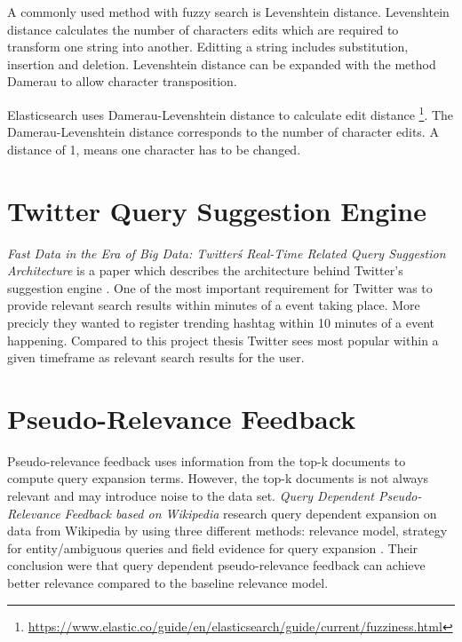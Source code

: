 A commonly used method with fuzzy search is Levenshtein distance.
Levenshtein distance calculates the number of characters edits which are required to transform one string into another.
Editting a string includes substitution, insertion and deletion.
Levenshtein distance can be expanded with the method Damerau to allow character transposition.

Elasticsearch uses Damerau-Levenshtein distance to calculate edit distance \footnote{\url{https://www.elastic.co/guide/en/elasticsearch/guide/current/fuzziness.html}}.
The Damerau-Levenshtein distance corresponds to the number of character edits.
A distance of 1, means one character has to be changed.

\section{Twitter Query Suggestion Engine}
\textit{Fast Data in the Era of Big Data: Twitter\'s Real-Time Related Query Suggestion Architecture} is a paper which describes the architecture behind Twitter's suggestion engine \cite{twitter-suggestion}.
One of the most important requirement for Twitter was to provide relevant search results within minutes of a event taking place.
More precicly they wanted to register trending hashtag within 10 minutes of a event happening.
Compared to this project thesis Twitter sees most popular within a given timeframe as relevant search results for the user.

\section{Pseudo-Relevance Feedback}
Pseudo-relevance feedback uses information from the top-k documents to compute query expansion terms.
However, the top-k documents is not always relevant and may introduce noise to the data set.
\textit{Query Dependent Pseudo-Relevance Feedback based on Wikipedia} research query dependent expansion on data from Wikipedia by using three different methods:
relevance model, strategy for entity/ambiguous queries and field evidence for query expansion \cite{pseudo-relevance-wikipedia}.
Their conclusion were that query dependent pseudo-relevance feedback can achieve better relevance compared to the baseline relevance model.

